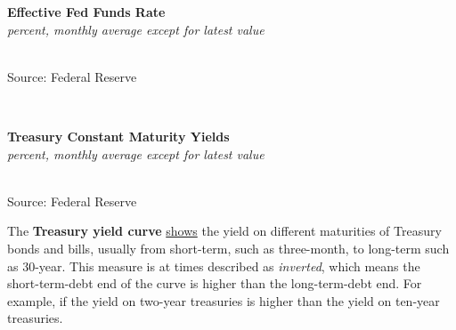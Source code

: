 \documentclass{report}
\makeatletter
\newcommand{\tbllink}[1]{\href{https://raw.githubusercontent.com/bdecon/US-chartbook/master/chartbook/data/#1}{\faTable}}
\newcommand*\short[1]{\expandafter\@gobbletwo\number\numexpr#1\relax}
\newcommand{\stdnode}[3]{\node[below, align=left, shift=({#1,#2})]{#3};}
\newcommand{\dateaxisticks}{
		date coordinates in=x, axis line style={draw=none},
		xmax={2020-05-10},
		max space between ticks=40,	    
		xtick={{1990-01-01}, {1992-01-01}, {1994-01-01}, 
			{1996-01-01}, {1998-01-01}, {2000-01-01}, 
			{2002-01-01}, {2004-01-01}, {2006-01-01},
			{2008-01-01}, {2010-01-01}, {2012-01-01}, {2014-01-01},
		    {2016-01-01}, {2018-01-01}, {2020-01-01}},
		minor xtick={{1989-01-01}, {1991-01-01}, {1993-01-01},
			{1995-01-01}, {1997-01-01}, {1999-01-01}, 
			{2001-01-01}, {2003-01-01}, {2005-01-01}, {2007-01-01},
		    {2009-01-01}, {2011-01-01}, {2013-01-01}, {2015-01-01},
		    {2017-01-01}, {2019-01-01}},
		enlarge y limits={0.06}, enlarge x limits={0.01},
		}
\newcommand{\bbar}[2]{extra #1 ticks = {{#2}}, extra #1 tick labels = ,
		extra #1 tick style = {grid=major, grid style={thick, black!25}},}
\newcommand{\stdline}[4]{\addplot[very thick, no markers, color=#1] 
		table [x=#2, y=#3, col sep=comma] {#4};	}
\newcommand{\rbars}{
		\fill[color=black!10] (axis cs:{1990-07-01},\pgfkeysvalueof{/pgfplots/ymin}) rectangle 
			(axis cs:{1991-03-01}, \pgfkeysvalueof{/pgfplots/ymax});
		\fill[color=black!10] (axis cs:{2007-12-01},\pgfkeysvalueof{/pgfplots/ymin}) rectangle 
			(axis cs:{2009-07-01}, \pgfkeysvalueof{/pgfplots/ymax});
		\fill[color=black!10] (axis cs:{2001-03-01},\pgfkeysvalueof{/pgfplots/ymin}) rectangle 
			(axis cs:{2001-11-01}, \pgfkeysvalueof{/pgfplots/ymax});}
\makeatother
\begin{document}
{{{{{{{{{\begin{minipage}{0.76\textwidth}
\noindent \normalsize \textbf{Effective Fed Funds Rate}\\
\footnotesize{\textit{percent, monthly average except for latest value }}\\ 
\noindent \hspace*{-2mm} \\
\footnotesize{Source: Federal Reserve} \hfill \tbllink{rates.csv}\\

\vspace{3mm}

\small  \\

\vspace{1mm}

\noindent \normalsize \textbf{Treasury Constant Maturity Yields}\\
\footnotesize{\textit{percent, monthly average except for latest value }}\\ 
\noindent \hspace*{-2mm} \\
\footnotesize{Source: Federal Reserve} \hfill \tbllink{rates.csv}

\end{minipage}

\newpage

\begin{minipage}{0.76\textwidth}

\small The \textbf{Treasury yield curve} \href{https://www.treasury.gov/resource-center/data-chart-center/interest-rates/Pages/TextView.aspx?data=yield}{shows} the yield on different maturities of Treasury bonds and bills, usually from short-term, such as three-month, to long-term such as 30-year. This measure is at times described as \textit{inverted}, which means the short-term-debt end of the curve is higher than the long-term-debt end. For example, if the yield on two-year treasuries is higher than the yield on ten-year treasuries. \\


\end{minipage}}}}}}}}}}
\end{document}
